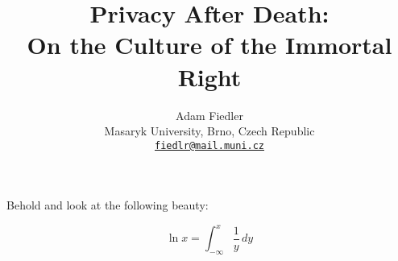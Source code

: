 \documentclass[a4paper]{article}
\title{
    Privacy After Death:\\
    On the Culture of the Immortal Right
}
\author{
    Adam Fiedler\\
    \small
    Masaryk University, Brno, Czech Republic\\
    \small
    \texttt{\href{mailto:fiedlr@mail.muni.cz}{fiedlr@mail.muni.cz}}
}
\date{}
\begin{document}
\maketitle

Behold and look at the following beauty:

$$ \ln x = \int_{-\infty}^x \frac 1 y \, dy  $$
\end{document}

